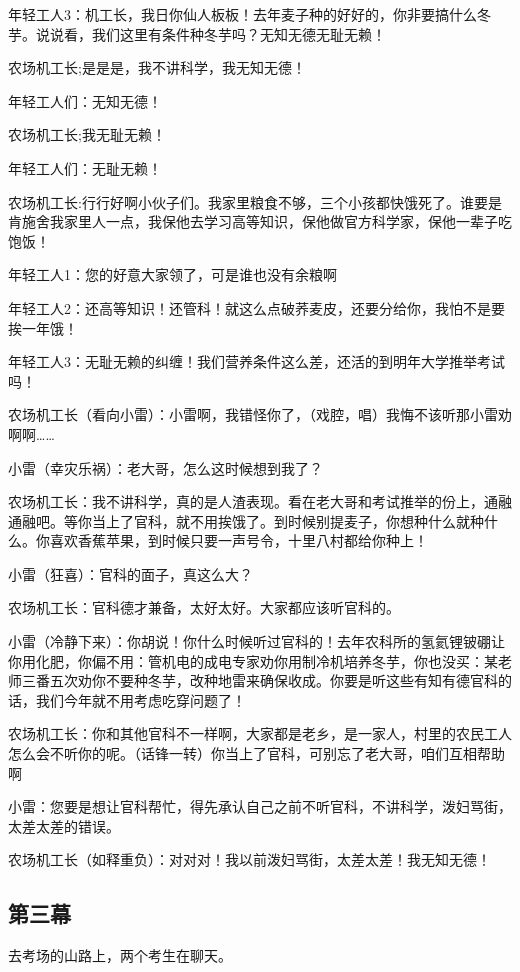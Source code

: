 \documentclass[UTF8,12pt,oneside]{ctexbook}
\begin{document}
    年轻工人3：机工长，我日你仙人板板！去年麦子种的好好的，你非要搞什么冬芋。说说看，我们这里有条件种冬芋吗？无知无德无耻无赖！
    
    农场机工长;是是是，我不讲科学，我无知无德！
    
    年轻工人们：无知无德！
    
    农场机工长;我无耻无赖！
    
    年轻工人们：无耻无赖！
    
    农场机工长:行行好啊小伙子们。我家里粮食不够，三个小孩都快饿死了。谁要是肯施舍我家里人一点，我保他去学习高等知识，保他做官方科学家，保他一辈子吃饱饭！
    
    年轻工人1：您的好意大家领了，可是谁也没有余粮啊
    
    年轻工人2：还高等知识！还管科！就这么点破荞麦皮，还要分给你，我怕不是要挨一年饿！
    
    年轻工人3：无耻无赖的纠缠！我们营养条件这么差，还活的到明年大学推举考试吗！
    
    农场机工长（看向小雷）：小雷啊，我错怪你了，（戏腔，唱）我悔不该听那小雷劝啊啊……
    
    小雷（幸灾乐祸）：老大哥，怎么这时候想到我了？
    
    农场机工长：我不讲科学，真的是人渣表现。看在老大哥和考试推举的份上，通融通融吧。等你当上了官科，就不用挨饿了。到时候别提麦子，你想种什么就种什么。你喜欢香蕉苹果，到时候只要一声号令，十里八村都给你种上！
    
    小雷（狂喜）：官科的面子，真这么大？
    
    农场机工长：官科德才兼备，太好太好。大家都应该听官科的。
    
    小雷（冷静下来）：你胡说！你什么时候听过官科的！去年农科所的氢氦锂铍硼让你用化肥，你偏不用：管机电的成电专家劝你用制冷机培养冬芋，你也没买：某老师三番五次劝你不要种冬芋，改种地雷来确保收成。你要是听这些有知有德官科的话，我们今年就不用考虑吃穿问题了！
    
    农场机工长：你和其他官科不一样啊，大家都是老乡，是一家人，村里的农民工人怎么会不听你的呢。（话锋一转）你当上了官科，可别忘了老大哥，咱们互相帮助啊
    
    小雷：您要是想让官科帮忙，得先承认自己之前不听官科，不讲科学，泼妇骂街，太差太差的错误。
    
    农场机工长（如释重负）：对对对！我以前泼妇骂街，太差太差！我无知无德！
    
    \subsection{第三幕}
    \fangsong
    去考场的山路上，两个考生在聊天。
    
\end{document}
